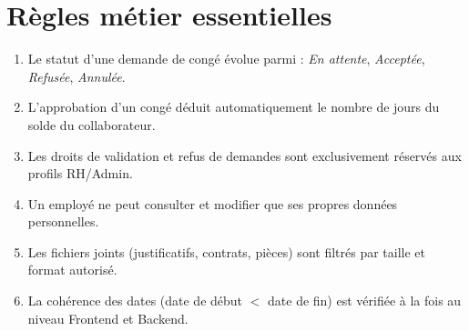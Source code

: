 \documentclass[12pt,a4paper]{report}
\begin{document}
\section{Règles métier essentielles}
\begin{enumerate}
    \item Le statut d'une demande de congé évolue parmi : \textit{En attente}, \textit{Acceptée}, \textit{Refusée}, \textit{Annulée}.
    \item L'approbation d'un congé déduit automatiquement le nombre de jours du solde du collaborateur.
    \item Les droits de validation et refus de demandes sont exclusivement réservés aux profils RH/Admin.
    \item Un employé ne peut consulter et modifier que ses propres données personnelles.
    \item Les fichiers joints (justificatifs, contrats, pièces) sont filtrés par taille et format autorisé.
    \item La cohérence des dates (date de début $<$ date de fin) est vérifiée à la fois au niveau Frontend et Backend.
\end{enumerate}
\end{document}
